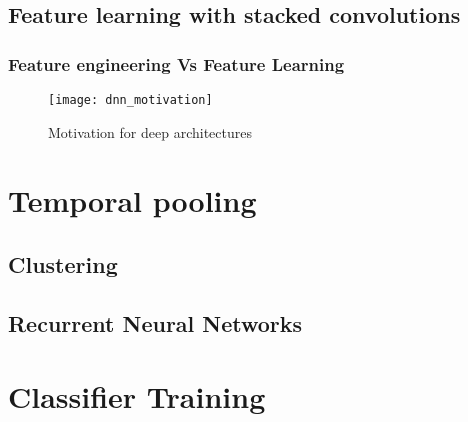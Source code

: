 \subsection{Feature learning with stacked convolutions}
\label{stacked}

\subsubsection{Feature engineering Vs Feature Learning}
\label{feature}

\begin{figure}[h] 
\centering
\texttt{[image: dnn\_motivation]}
\caption{Motivation for deep architectures}
 \label{fig:deep learning}
 \end{figure}
\FloatBarrier
\bigskip

\section{Temporal pooling}
\label{temporal}
\subsection{Clustering}
\label{clustering}
\subsection{Recurrent Neural Networks}
\label{rnn}

\section{Classifier Training}
\label{classifier}

